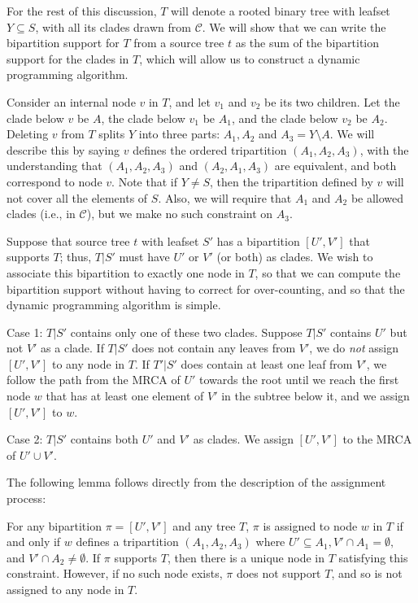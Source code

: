 For the rest of this discussion, $T$ will denote a rooted
binary
tree with leafset $Y \subseteq S$, with all its
clades drawn from $\mathcal{C}$.  We will show that we
can write the bipartition support for $T$ from a source tree
$t$ as the sum of the bipartition support for the clades in $T$,
which will allow us to construct a dynamic programming algorithm.

Consider an internal node $v$ in $T$, and let
$v_1$ and $v_2$ be its two children. 
Let the clade below $v$ be $A$, the clade
below $v_1$ be $A_1$, and the clade below $v_2$ be $A_2$.
Deleting $v$ from $T$ splits $Y$ 
into  three parts: $A_1, A_2$ and $A_3=Y \setminus A$.
We will describe this by saying $v$ defines
the ordered tripartition $(A_1, A_2,A_3)$,  with the  understanding
that $(A_1, A_2, A_3)$ and $(A_2, A_1, A_3)$ are
equivalent, and both correspond to node $v$. Note
that if $Y \neq S$, then
the tripartition defined by $v$ will not cover all the elements of $S$.
Also,  we will require that $A_1$ and $A_2$ be allowed clades (i.e., in $\mathcal{C}$),
but we make no such constraint on $A_3$.

Suppose that source tree $t$ with
leafset $S'$ has a bipartition $[U',V']$ that supports 
$T$; thus, $T|S'$ must have $U'$ or $V'$ (or both) as clades.
We wish to associate this bipartition to exactly one node in 
$T$, so that we can compute the bipartition support without having
to correct for over-counting, and so that the dynamic programming
algorithm is simple.

Case 1: $T|S'$ contains only one of these two clades. Suppose
$T|S'$ contains $U'$ but not $V'$ as a clade.
If $T|S'$ does not contain any leaves from $V'$, we
do {\em not}
assign
$[U',V']$ to any node in $T$. 
If $T'|S'$ does contain at least one leaf from $V'$, we
follow the path from the MRCA of $U'$ towards the
root until we reach the first node $w$ that
has at least one element of $V'$ in the subtree below it, and
we assign $[U',V']$ to $w$.

Case 2: $T|S'$ contains both $U'$ and $V'$ as clades.
We assign
$[U',V']$ to 
the MRCA of $U' \cup V'$.

The following lemma follows directly from the
description of the assignment process:
\begin{lemma}
For any bipartition $\pi = [U',V']$ and any tree $T$, 
$\pi$ is assigned to
node
$w$ in $T$ if and only if $w$ defines a tripartition
$(A_1, A_2, A_3)$ where
$U' \subseteq A_1, V' \cap A_1 = \emptyset, $ and
$V' \cap A_2 \neq \emptyset$.
If $\pi$ supports $T$, then 
there is a unique node in $T$
satisfying this constraint. However,
if no such node exists, $\pi$
does not support $T$, and so is
not assigned to any node in $T$.
\label{fastrfs::lemma-tripartition}
\end{lemma}


